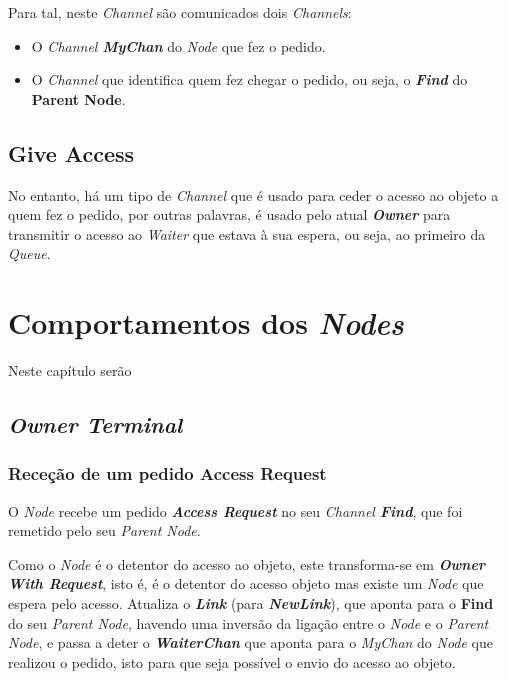 Para tal, neste \emph{Channel} são comunicados dois \emph{Channels}:
\begin{itemize} \item O \emph{Channel \textbf{MyChan}} do \emph{Node} que fez o pedido.
    \item O \emph{Channel} que identifica quem fez chegar o pedido, ou seja, o \emph{\textbf{Find}} do \textbf{Parent Node}.
\end{itemize}


\subsection*{Give Access}
No entanto, há um tipo de \emph{Channel} que é usado para ceder o acesso ao objeto a quem fez o pedido, por outras palavras, é usado pelo atual \emph{\textbf{Owner}} para transmitir o acesso ao \emph{Waiter} que estava à sua espera, ou seja, ao primeiro da \emph{Queue}.



\section{Comportamentos dos \emph{Nodes}}

Neste capítulo serão 

\subsection*{\emph{Owner Terminal}}
\label{especificacao:nodes:owner_terminal}


\subsubsection*{Receção de um pedido Access Request}
O \emph{Node} recebe um pedido \emph{\textbf{Access Request}} no seu \emph{Channel \textbf{Find}},
que foi remetido pelo seu \emph{Parent Node}. 


Como o \emph{Node} é o detentor do acesso ao objeto, este transforma-se em \emph{\textbf{Owner With Request}},
isto é, é o detentor do acesso objeto mas existe um \emph{Node} que espera pelo acesso.
Atualiza o \textbf{\emph{Link}} (para \textbf{\emph{NewLink}}),
que aponta para o \textbf{Find} do seu \emph{Parent Node}, havendo uma inversão da ligação entre o \emph{Node} e o \emph{Parent Node},
e passa a deter o \textbf{\emph{WaiterChan}} que aponta para o \emph{MyChan} do \emph{Node} que realizou o pedido, isto para
que seja possível o envio do acesso ao objeto.


